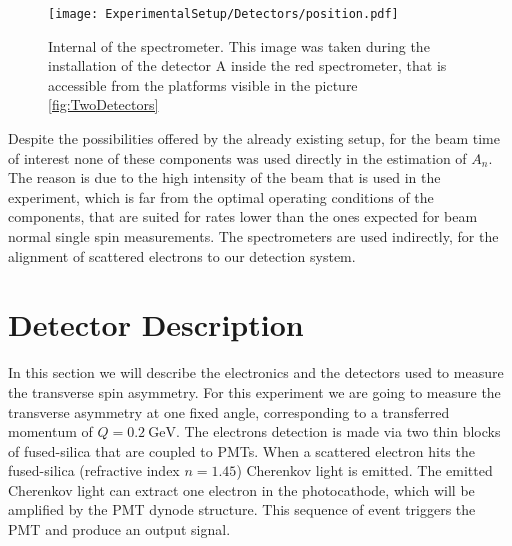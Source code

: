 \begin{figure}
\centering
\caption{Internal of the spectrometer. This image was taken during the installation of the detector A inside the red spectrometer, that is accessible from the platforms visible in the picture \ref{fig:TwoDetectors}}
\texttt{[image: ExperimentalSetup/Detectors/position.pdf]}
\label{fig:internal}
\end{figure} 

Despite the possibilities offered by the already existing setup, for the beam time of interest none of these components was used directly in the estimation of $A_{n}$. The reason is due to the high intensity of the beam that is used in the experiment, which is far from the optimal operating conditions of the components, that are suited for rates lower than the ones expected for beam normal single spin measurements. The spectrometers are used indirectly, for the alignment of scattered electrons to our detection system.


\section{Detector Description} \label{detectors}
In this section we will describe the electronics and the detectors used to measure the transverse spin asymmetry.
For this experiment we are going to measure the transverse asymmetry at one fixed angle, corresponding to a transferred momentum of $Q = \SI{0.2}{\giga \electronvolt}$. The electrons detection is 
made via two thin blocks of fused-silica that are coupled to PMTs. When a scattered electron hits the fused-silica (refractive index $n = 1.45$) Cherenkov light is emitted. The emitted Cherenkov light can extract one electron in the photocathode, which will be amplified by the PMT dynode structure. This sequence of event triggers the PMT and produce an output signal.

